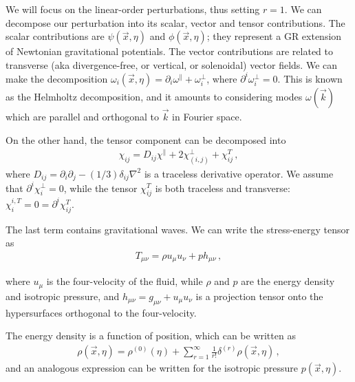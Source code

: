 \documentclass[main.tex]{subfiles}
\begin{document}

We will focus on the linear-order perturbations, thus setting \(r = 1\).
We can decompose our perturbation into its scalar, vector and tensor contributions. 
The scalar contributions are \(\psi (\vec{x}, \eta )\) and \(\phi (\vec{x}, \eta )\); they represent a GR extension of Newtonian gravitational potentials. 
The vector contributions are related to transverse (aka divergence-free, or vertical, or solenoidal) vector fields.
We can make the decomposition \(\omega _i (\vec{x}, \eta ) = \partial_i \omega^{\parallel} + \omega _i^{\perp}\), where \(\partial^{i} \omega _i^{\perp} = 0\). This is known as the Helmholtz decomposition, and it amounts to considering modes \(\omega (\vec{k})\) which are parallel and orthogonal to \(\vec{k}\) in Fourier space.

On the other hand, the tensor component can be decomposed into 
%
\begin{align}
\chi_{ij} = D_{ij} \chi^{\parallel} + 2 \chi^{\perp}_{(i, j)} + \chi_{ij}^{T}
\,,
\end{align}
%
where \(D_{ij} = \partial_i \partial_{j} - (1/3) \delta_{ij} \nabla^2\) is a traceless derivative operator.
We assume that \(\partial^{i} \chi_{i}^{\perp} = 0\), while the tensor \(\chi_{ij}^{T}\) is both traceless and transverse: \(\chi_{i}^{i, T} = 0 = \partial^{i} \chi_{ij}^{T}\).

The last term contains gravitational waves. 
We can write the stress-energy tensor as 
%
\begin{align}
T_{\mu \nu } = \rho u_\mu u_\nu + p h_{\mu \nu  }
\,,
\end{align}

where \(u_\mu \) is the four-velocity of the fluid, while \(\rho \) and \(p\) are the energy density and isotropic pressure, and \(h_{\mu \nu } = g_{\mu \nu} + u_\mu u_\nu \) is a projection tensor onto the hypersurfaces orthogonal to the four-velocity.

The energy density is a function of position, which can be written as 
%
\begin{align}
\rho (\vec{x}, \eta ) = \rho^{(0)}(\eta ) + \sum _{r=1}^{\infty } \frac{1}{r!} \delta^{(r)} \rho (\vec{x}, \eta )
\,,
\end{align}
%
and an analogous expression can be written for the isotropic pressure \(p(\vec{x}, \eta )\). 
\end{document}
